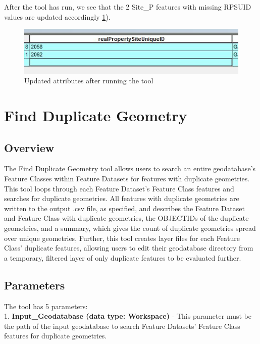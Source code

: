 \documentclass[openany]{book}
\theoremstyle{definition}
\theoremstyle{definition}
\theoremstyle{definition}
\theoremstyle{remark}
\begin{document}
After the tool has run, we see that the 2 Site\_P features with missing
RPSUID values are updated accordingly \ref{fig:sjcafter}).

\begin{figure}[H]

{\centering \includegraphics{figures/spatjoinCalc-after} 

}

\caption{Updated attributes after running the tool}\label{fig:sjcafter}
\end{figure}

\hypertarget{dupGeom}{\chapter{Find Duplicate Geometry}\label{dupGeom}}

\section{Overview}\label{overview-2}

The Find Duplicate Geometry tool allows users to search an entire
geodatabase's Feature Classes within Feature Datasets for features with
duplicate geometries. This tool loops through each Feature Dataset's
Feature Class features and searches for duplicate geometries. All
features with duplicate geometries are written to the output .csv file,
as specified, and describes the Feature Dataset and Feature Class with
duplicate geometries, the OBJECTIDs of the duplicate geometries, and a
summary, which gives the count of duplicate geometries spread over
unique geometries, Further, this tool creates layer files for each
Feature Class' duplicate features, allowing users to edit their
geodatabase directory from a temporary, filtered layer of only duplicate
features to be evaluated further.

\section{Parameters}\label{parameters-2}

The tool has 5 parameters:\\
1. \textbf{Input\_Geodatabase (data type: Workspace)} - This parameter
must be the path of the input geodatabase to search Feature Datasets'
Feature Class features for duplicate geometries.
\end{document}
